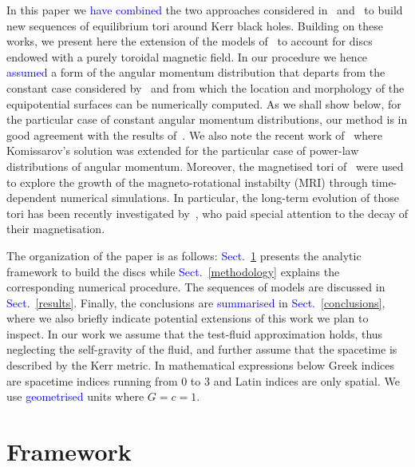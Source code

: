 \documentclass{aa}
\newcommand{\sg}[1]{\textcolor{blue}{#1}}
\begin{document}
 In this paper we \sg{have combined} the two approaches considered in~\cite{Komissarov:2006} and~\citet{Qian:2009} to build new sequences of equilibrium tori around Kerr black holes. Building on these works, we present here the extension of the models of~\citet{Qian:2009} to account for discs endowed with a purely toroidal magnetic field. In our procedure we hence \sg{assumed} a form of the angular momentum distribution that departs from the constant case considered by~\cite{Komissarov:2006} and from which the location and morphology of the equipotential surfaces can be numerically computed. As we shall show below, for the particular case of constant angular momentum distributions, our method is in good agreement with the results of~\citet{Komissarov:2006}. We also note the recent work of~\citet{Wielgus:2015} where Komissarov's solution was extended for the particular case of power-law distributions of angular momentum. Moreover, the magnetised tori of~\citet{Wielgus:2015} were used to explore the growth of the magneto-rotational instabilty (MRI) through time-dependent numerical simulations. In particular, the long-term evolution of those tori has been recently investigated by~\citet{Fragile:2017}, who paid special attention to the decay of their magnetisation. 

The organization of the paper is as follows: \sg{Sect.}~\ref{framework} presents the analytic framework to build the discs while \sg{Sect.}~\ref{methodology} explains the corresponding numerical procedure. The sequences of models are discussed in \sg{Sect.}~\ref{results}. Finally, the conclusions are \sg{summarised} in \sg{Sect.}~\ref{conclusions}, where we also briefly indicate potential extensions of this work we plan to inspect. In our work we assume that the test-fluid approximation holds, thus neglecting the self-gravity of the fluid, and further assume that the spacetime is described by the Kerr metric. In mathematical expressions below Greek indices are spacetime indices running from 0 to 3 and Latin indices are only spatial. We use \sg{geometrised} units where $G = c = 1$.

\section{Framework}
\label{framework}
\end{document}
